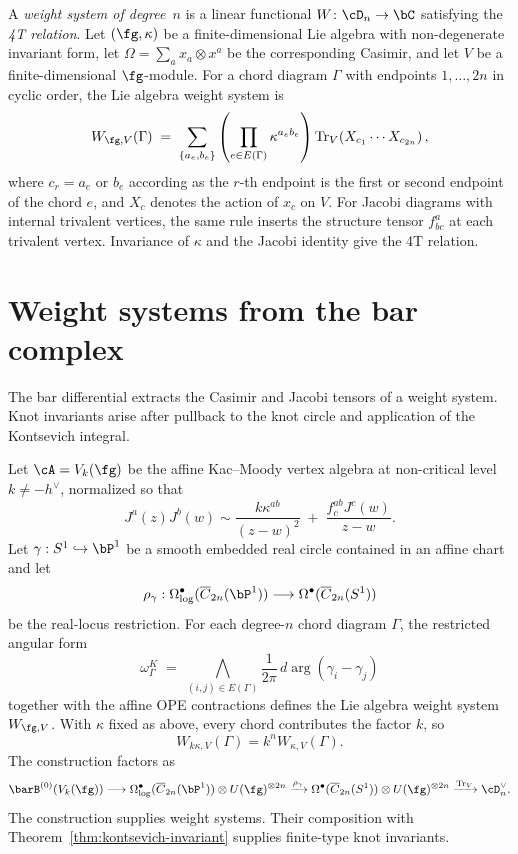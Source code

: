 \begin{definition}
\label{def:weight-system}
A \emph{weight system of degree~$n$} is a linear functional
$W\colon \cD_n \to \bC$ satisfying the \emph{4T relation}.  Let
$(\fg,\kappa)$ be a finite-dimensional Lie algebra with
non-degenerate invariant form, let $\Omega=\sum_a x_a\otimes x^a$
be the corresponding Casimir, and let $V$ be a finite-dimensional
$\fg$-module.  For a chord diagram $\Gamma$ with endpoints
$1,\ldots,2n$ in cyclic order, the Lie algebra weight system is
\[
W_{\fg,V}(\Gamma)
\;=\;
\sum_{\{a_e,b_e\}}
\left(\prod_{e\in E(\Gamma)}\kappa^{a_e b_e}\right)
\operatorname{Tr}_{V}\!\left(
X_{c_1}\cdots X_{c_{2n}}
\right),
\]
where $c_r=a_e$ or $b_e$ according as the $r$-th endpoint is the
first or second endpoint of the chord $e$, and $X_c$ denotes the
action of $x_c$ on $V$.  For Jacobi diagrams with internal trivalent
vertices, the same rule inserts the structure tensor $f^a_{bc}$ at
each trivalent vertex.  Invariance of $\kappa$ and the Jacobi
identity give the 4T relation.
\end{definition}

\section{Weight systems from the bar complex}
\label{sec:weight-systems-bar}

The bar differential extracts the Casimir and Jacobi tensors of a weight
system. Knot invariants arise after pullback to the knot circle and application
of the Kontsevich integral.

\begin{theorem}
\label{thm:bar-weight-systems}
Let $\cA=V_k(\fg)$ be the affine Kac--Moody vertex algebra at
non-critical level $k\neq -h^\vee$, normalized so that
\[
J^a(z)J^b(w)
\sim
\frac{k\kappa^{ab}}{(z-w)^2}
\;+\;
\frac{f^{ab}_{c}J^c(w)}{z-w}.
\]
Let $\gamma:S^1\hookrightarrow \bP^1$ be a smooth embedded real
circle contained in an affine chart and let
\[
\rho_\gamma:\Omega^\bullet_{\log}(\overline{C}_{2n}(\bP^1))
\longrightarrow
\Omega^\bullet(\overline{C}_{2n}(S^1))
\]
be the real-locus restriction.  For each degree-$n$ chord diagram
$\Gamma$, the restricted angular form
\[
\omega^K_\Gamma
\;=\;
\bigwedge_{(i,j)\in E(\Gamma)}
\frac{1}{2\pi}\,d\arg(\gamma_i-\gamma_j)
\]
together with the affine OPE contractions defines the Lie algebra
weight system $W_{\fg,V}$.  With $\kappa$ fixed as above, every chord
contributes the factor $k$, so
\[
W_{k\kappa,V}(\Gamma)=k^n W_{\kappa,V}(\Gamma).
\]
The construction factors as
\[
\barB^{(0)}(V_k(\fg))
\longrightarrow
\Omega^\bullet_{\log}(\overline{C}_{2n}(\bP^1))\otimes U(\fg)^{\otimes 2n}
\xrightarrow{\rho_\gamma}
\Omega^\bullet(\overline{C}_{2n}(S^1))\otimes U(\fg)^{\otimes 2n}
\xrightarrow{\operatorname{Tr}_V}
\cD_n^\vee .
\]
The construction supplies weight systems. Their composition with
Theorem~\ref{thm:kontsevich-invariant} supplies finite-type knot invariants.
\end{theorem}


